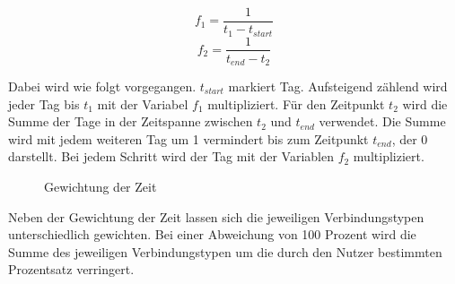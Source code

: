 \begin{equation}
f_1 = \frac{1}{t_1 - t_{start}}
\end{equation}
\begin{equation}
f_2 = \frac{1}{t_{end} - t_2}
\end{equation}

Dabei wird wie folgt vorgegangen. $t_{start}$ markiert Tag. Aufsteigend zählend wird jeder Tag bis $t_1$ mit der Variabel $f_1$ multipliziert. Für den Zeitpunkt $t_2$ wird die Summe der Tage in der Zeitspanne zwischen $t_2$ und $t_{end}$ verwendet. Die Summe wird mit jedem weiteren Tag um 1 vermindert bis zum Zeitpunkt $t_{end}$, der 0 darstellt. Bei jedem Schritt wird der Tag mit der Variablen $f_2$ multipliziert.

\begin{figure}[htbp]
\begin{center}
\end{center}
\caption{Gewichtung der Zeit}
\label{fig:umsetzung:gewichtungderzeit}
\end{figure}

Neben der Gewichtung der Zeit lassen sich die jeweiligen Verbindungstypen unterschiedlich gewichten. Bei einer Abweichung von 100 Prozent wird die Summe des jeweiligen Verbindungstypen um die durch den Nutzer bestimmten Prozentsatz verringert. 

